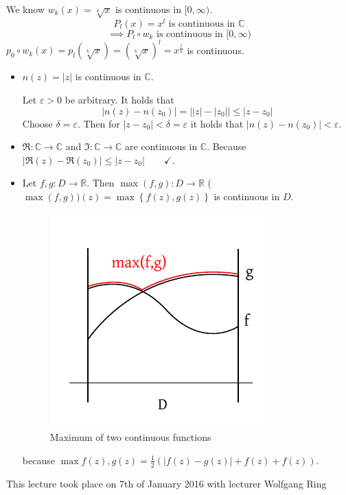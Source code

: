 \documentclass[a4paper,landscape,twocolumn]{article}
\theoremstyle{definition}
\newcommand\set[1]{\left\{#1\right\}}
\newcommand\abs[1]{\left|#1\right|}
\newcommand\meta[3]{\begin{mdframed}[skipbelow=4pt,skipabove=4pt,innermargin=1pt,innerleftmargin=1pt,innerrightmargin=1pt]\begin{center}\small{\textdownarrow{} This #1 took place on #2 with lecturer #3}\end{center}\end{mdframed}}
\begin{document}
We know $w_k(x) = \sqrt[k]{x}$ is continuous in $[0,\infty)$.
\[ P_l(x) = x^l \text{ is continuous in } \mathbb C \]
\[ \implies P_l \circ w_k \text{ is continuous in } [0,\infty) \]
$p_0 \circ w_k (x) = p_l(\sqrt[k]{x}) = \left(\sqrt[k]{x}\right)^l = x^{\frac lk}$ is continuous.

\begin{itemize}
  \item $n(z) = \abs{z}$ is continuous in $\mathbb C$.

    Let $\varepsilon > 0$ be arbitrary. It holds that
    \[ \abs{n(z) - n(z_0)} = \abs{\abs{z} - \abs{z_0}} \leq \abs{z - z_0} \]
    Choose $\delta = \varepsilon$. Then for $\abs{z - z_0} < \delta = \varepsilon$ it holds
    that $\abs{n(z) - n(z_0)} < \varepsilon$.
  \item $\Re: \mathbb C \to \mathbb C$ and $\Im: \mathbb C \to \mathbb C$ are continuous in $\mathbb C$.
    Because $\abs{\Re(z) - \Re(z_0)} \leq \abs{z - z_0} \qquad \checkmark$.
  \item
    Let $f, g: D \to \mathbb R$. Then $\max(f, g): D \to \mathbb R$
    ($\max(f, g))(z) = \max\set{f(z), g(z)}$ is continuous in $D$.
    \begin{figure}[t]
      \begin{center}
        \includegraphics{img/max_of_continuous_functions.pdf}
        \caption{Maximum of two continuous functions}
      \end{center}
    \end{figure}
    because $\max{f(z), g(z)} = \frac12 \left(\abs{f(z) - g(z)} + f(z) + f(z)\right)$.
\end{itemize}

\meta{lecture}{7th of January 2016}{Wolfgang Ring}
\end{document}
